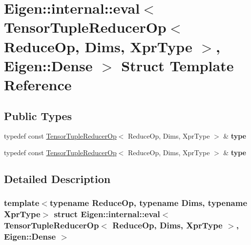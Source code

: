 \hypertarget{struct_eigen_1_1internal_1_1eval_3_01_tensor_tuple_reducer_op_3_01_reduce_op_00_01_dims_00_01_xpfa3431995abe939b85159a164be4ee8a}{}\section{Eigen\+:\+:internal\+:\+:eval$<$ Tensor\+Tuple\+Reducer\+Op$<$ Reduce\+Op, Dims, Xpr\+Type $>$, Eigen\+:\+:Dense $>$ Struct Template Reference}
\label{struct_eigen_1_1internal_1_1eval_3_01_tensor_tuple_reducer_op_3_01_reduce_op_00_01_dims_00_01_xpfa3431995abe939b85159a164be4ee8a}
\subsection*{Public Types}
\begin{DoxyCompactItemize}
\item 
\mbox{\label{struct_eigen_1_1internal_1_1eval_3_01_tensor_tuple_reducer_op_3_01_reduce_op_00_01_dims_00_01_xpfa3431995abe939b85159a164be4ee8a_a9ae5f10df4edc6fe899135d529c71bf5}} 
typedef const \hyperlink{class_eigen_1_1_tensor_tuple_reducer_op}{Tensor\+Tuple\+Reducer\+Op}$<$ Reduce\+Op, Dims, Xpr\+Type $>$ \& {\bfseries type}
\item 
\mbox{\label{struct_eigen_1_1internal_1_1eval_3_01_tensor_tuple_reducer_op_3_01_reduce_op_00_01_dims_00_01_xpfa3431995abe939b85159a164be4ee8a_a9ae5f10df4edc6fe899135d529c71bf5}} 
typedef const \hyperlink{class_eigen_1_1_tensor_tuple_reducer_op}{Tensor\+Tuple\+Reducer\+Op}$<$ Reduce\+Op, Dims, Xpr\+Type $>$ \& {\bfseries type}
\end{DoxyCompactItemize}


\subsection{Detailed Description}
\subsubsection*{template$<$typename Reduce\+Op, typename Dims, typename Xpr\+Type$>$\newline
struct Eigen\+::internal\+::eval$<$ Tensor\+Tuple\+Reducer\+Op$<$ Reduce\+Op, Dims, Xpr\+Type $>$, Eigen\+::\+Dense $>$}



